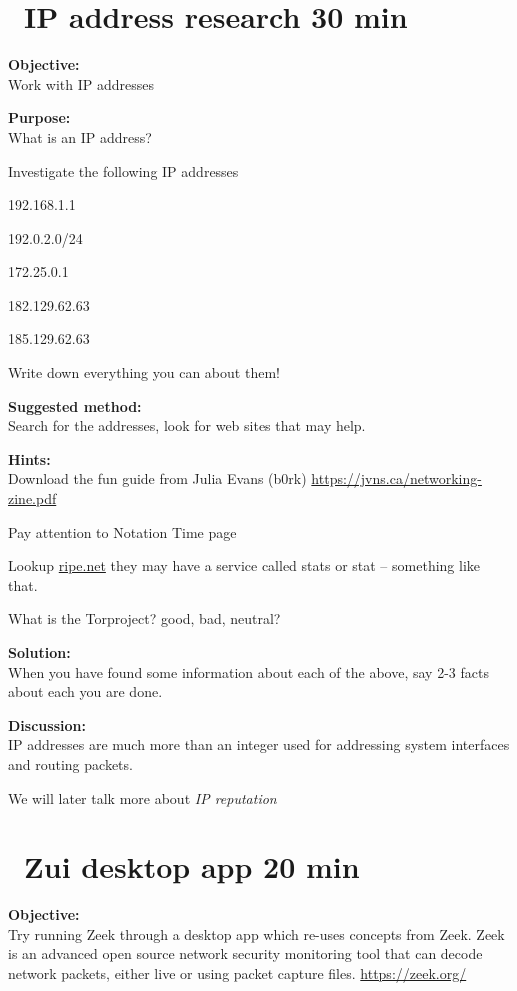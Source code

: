 \documentclass[a4paper,11pt,notitlepage]{report}
\begin{document}
\chapter{\faExclamationTriangle\ IP address research 30 min}
\label{ex:ip-address-research}

{\bf Objective:}\\
Work with IP addresses

{\bf Purpose:}\\
What is an IP address?

Investigate the following IP addresses
\begin{list2}
\item 192.168.1.1
\item 192.0.2.0/24
\item 172.25.0.1
\item 182.129.62.63
\item 185.129.62.63
\end{list2}

Write down everything you can about them!

{\bf Suggested method:}\\
Search for the addresses, look for web sites that may help.

{\bf Hints:}\\
Download the fun guide from Julia Evans (b0rk) \url{https://jvns.ca/networking-zine.pdf}

Pay attention to Notation Time page

Lookup \url{ripe.net} they may have a service called stats or stat -- something like that.

What is the Torproject? good, bad, neutral?

{\bf Solution:}\\
When you have found some information about each of the above, say 2-3 facts about each you are done.

{\bf Discussion:}\\
IP addresses are much more than an integer used for addressing system interfaces and routing packets.

We will later talk more about \emph{IP reputation}


\chapter{\faInfoCircle\ Zui desktop app 20 min}
\label{ex:brim-security}


{\bf Objective:}\\
Try running Zeek through a desktop app which re-uses concepts from Zeek. Zeek is an advanced open source network security monitoring tool that can decode network packets, either live or using packet capture files. \url{https://zeek.org/}
\end{document}
